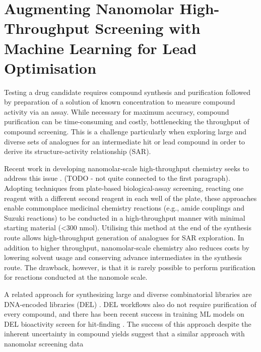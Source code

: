 \chapter{Augmenting Nanomolar High-Throughput Screening with Machine Learning for Lead Optimisation}\label{ch:testing}

Testing a drug candidate requires compound synthesis and purification followed by preparation of a solution of known concentration to measure compound activity via an assay. While necessary for maximum accuracy, compound purification can be time-consuming and costly, bottlenecking the throughput of compound screening. This is a challenge particularly when exploring large and diverse sets of analogues for an intermediate hit or lead compound in order to derive its structure-activity relationship (SAR).

Recent work in developing nanomolar-scale high-throughput chemistry seeks to address this issue \cite{Santarilla2015MerckNanomolar, Perera2018PfizerNanomolar, Gehrtz2022nanomolar}. (TODO - not quite connected to the first paragraph). Adopting techniques from plate-based biological-assay screening, reacting one reagent with a different second reagent in each well of the plate, these approaches enable commonplace medicinal chemistry reactions (e.g., amide couplings and Suzuki reactions) to be conducted in a high-throughput manner with minimal starting material (<300 nmol). Utilising this method at the end of the synthesis route allows high-throughput generation of analogues for SAR exploration. In addition to higher throughput, nanomolar-scale chemistry also reduces costs by lowering solvent usage and conserving advance intermediates in the synthesis route. The drawback, however, is that it is rarely possible to perform purification for reactions conducted at the nanomole scale. 

A related approach for synthesizing large and diverse combinatorial libraries are DNA-encoded libraries (DEL) \cite{GirondaMartinez2021DNALibrary}. DEL workflows also do not require purification of every compound, and there has been recent success in training ML models on DEL bioactivity screen for hit-finding \cite{McCloskey2020DNALibrary}. The success of this approach despite the inherent uncertainty in compound yields suggest that a similar approach with nanomolar screening data 


